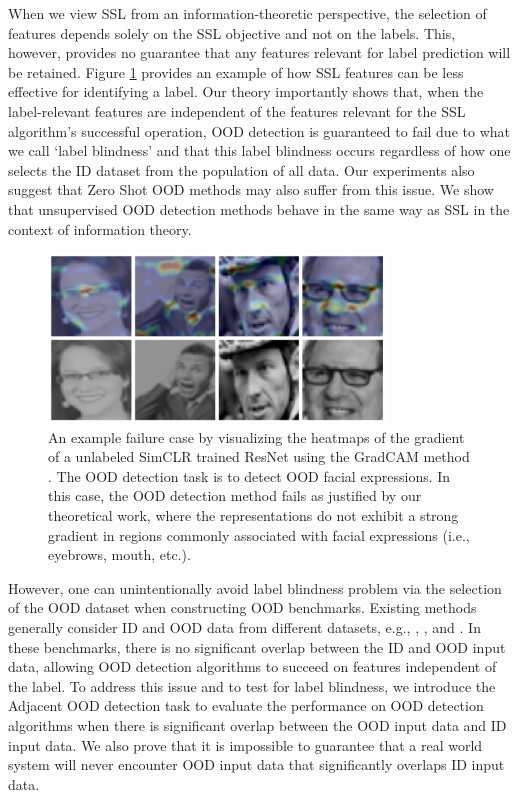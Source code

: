 \documentclass[11pt, oneside]{book}
\theoremstyle{plain}
\theoremstyle{definition}
\theoremstyle{remark}
\begin{document}
When we view SSL from an information-theoretic perspective, the selection of features depends solely on the SSL objective and not on the labels. This, however, provides no guarantee that any features relevant for label prediction will be retained. Figure \ref{fig:grad} provides an example of how SSL features can be less effective for identifying a label. Our theory importantly shows that, when the label-relevant features are independent of the features relevant for the SSL algorithm's successful operation, OOD detection is guaranteed to fail due to what we call `label blindness' and that this label blindness occurs regardless of how one selects the ID dataset from the population of all data. Our experiments also suggest that Zero Shot OOD methods \citep{wang2023clipn, esmaeilpour2022zero} may also suffer from this issue. We show that unsupervised OOD detection methods behave in the same way as SSL in the context of information theory.

\begin{figure}[h]
    \centering
    \includegraphics[width=0.8\textwidth]{gradcam_example_faces.png}
    \caption{An example failure case by visualizing the heatmaps of the gradient of a unlabeled SimCLR trained ResNet \citep{chen2020simple} using the GradCAM method \citep{selvaraju2017grad}. The OOD detection task is to detect OOD facial expressions. In this case, the OOD detection method fails as justified by our theoretical work, where the representations do not exhibit a strong gradient in regions commonly associated with facial expressions (i.e., eyebrows, mouth, etc.).}
    \label{fig:grad}
\end{figure}

However, one can unintentionally avoid label blindness problem via the selection of the OOD dataset when constructing OOD benchmarks. Existing methods generally consider ID and OOD data from different datasets, e.g., \citet{fort2021exploring}, \citet{sehwag2021ssd}, and \citet{hendrycks2019using}. In these benchmarks, there is no significant overlap between the ID and OOD input data, allowing OOD detection algorithms to succeed on features independent of the label. To address this issue and to test for label blindness, we introduce the Adjacent OOD detection task to evaluate the performance on OOD detection algorithms when there is significant overlap between the OOD input data and ID input data. We also prove that it is impossible to guarantee that a real world system will never encounter OOD input data that significantly overlaps ID input data.
\end{document}
